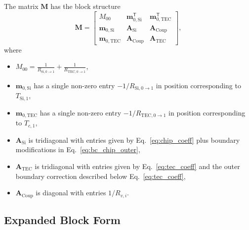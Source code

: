 \documentclass[conference]{IEEEtran}
\begin{document}
The matrix $\mathbf{M}$ has the block structure
\begin{equation}
	\mathbf{M} =
	\begin{bmatrix}
		M_{00} & \mathbf{m}_{0,\text{Si}}^{\mathsf{T}} & \mathbf{m}_{0,\text{TEC}}^{\mathsf{T}} \\
		\mathbf{m}_{0,\text{Si}} & \mathbf{A}_{\text{Si}} & \mathbf{A}_{\text{Coup}} \\
		\mathbf{m}_{0,\text{TEC}} & \mathbf{A}_{\text{Coup}} & \mathbf{A}_{\text{TEC}}
	\end{bmatrix},
	\label{eq:M_block}
\end{equation}
where
\begin{itemize}
	\item $M_{00} = \frac{1}{R_{\text{Si},0\to1}} + \frac{1}{R_{\text{TEC},0\to1}}$,
	\item $\mathbf{m}_{0,\text{Si}}$ has a single non-zero entry $-1/R_{\text{Si},0\to1}$ in position corresponding to $T_{\text{Si},1}$,
	\item $\mathbf{m}_{0,\text{TEC}}$ has a single non-zero entry $-1/R_{\text{TEC},0\to1}$ in position corresponding to $T_{c,1}$,
	\item $\mathbf{A}_{\text{Si}}$ is tridiagonal with entries given by Eq.~\eqref{eq:chip_coeff} plus boundary modifications in Eq.~\eqref{eq:bc_chip_outer},
	\item $\mathbf{A}_{\text{TEC}}$ is tridiagonal with entries given by Eq.~\eqref{eq:tec_coeff} and the outer boundary correction described below Eq.~\eqref{eq:tec_coeff},
	\item $\mathbf{A}_{\text{Coup}}$ is diagonal with entries $1/R_{v,i}$.
\end{itemize}

\subsection*{Expanded Block Form}
\end{document}
